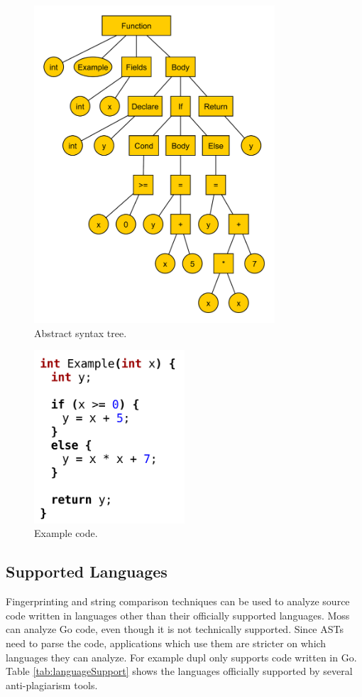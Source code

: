 \documentclass[journal,comsoc]{IEEEtran}
\begin{document}
			\begin{figure}
				\includegraphics[width=0.8\textwidth]{AST.pdf}
				\caption{Abstract syntax tree.}
				\label{fig:ast}
			\end{figure}
			\begin{figure}
				\includegraphics[width=0.5\textwidth]{ASTcode.png}
				\caption{Example code.}
				\label{fig:astcode}
			\end{figure}
		
		\subsection{Supported Languages}
		Fingerprinting and string comparison techniques can be used to analyze source code written in languages other than their officially supported languages. Moss can analyze Go code, even though it is not technically supported. Since ASTs need to parse the code, applications which use them are stricter on which languages they can analyze. For example dupl only supports code written in Go. Table \ref{tab:languageSupport} shows the languages officially supported by several anti-plagiarism tools.
		
\end{document}
